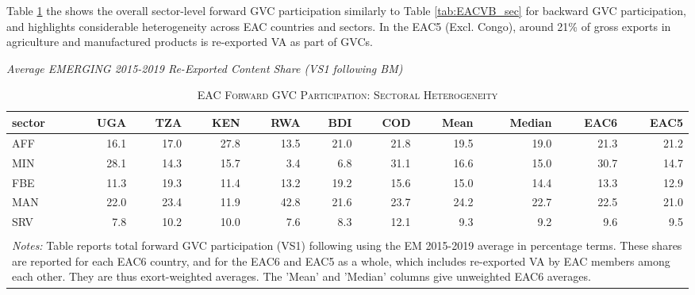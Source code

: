 \documentclass[a4paper]{article}
\begin{document}
Table \ref{tab:EACVS1_sec} the shows the overall sector-level forward GVC participation similarly to Table \ref{tab:EACVB_sec} for backward GVC participation, and highlights considerable heterogeneity across EAC countries and sectors. In the EAC5 (Excl. Congo), around 21\% of gross exports in agriculture and manufactured products is re-exported VA as part of GVCs. 

\begin{table}[h]  \vspace{-1mm}
\centering
\caption{\label{tab:EACVS1_sec}\textsc{EAC Forward GVC Participation: Sectoral Heterogeneity}}
\small{\textit{Average EMERGING 2015-2019 Re-Exported Content Share (VS1 following BM)}} \\
\vspace{1mm}
\begin{tabular}{lrrrrrrrrrr}
  \toprule
sector & UGA & TZA & KEN & RWA & BDI & COD & Mean & Median & EAC6 & EAC5 \\ 
  \midrule
AFF & 16.1 & 17.0 & 27.8 & 13.5 & 21.0 & 21.8 & 19.5 & 19.0 & 21.3 & 21.2\\ 
  MIN & 28.1 & 14.3 & 15.7 & 3.4 & 6.8 & 31.1 & 16.6 & 15.0 & 30.7 & 14.7\\ 
  FBE & 11.3 & 19.3 & 11.4 & 13.2 & 19.2 & 15.6 & 15.0 & 14.4 & 13.3 & 12.9\\ 
  MAN & 22.0 & 23.4 & 11.9 & 42.8 & 21.6 & 23.7 & 24.2 & 22.7 & 22.5 & 21.0\\ 
  SRV & 7.8 & 10.2 & 10.0 & 7.6 & 8.3 & 12.1 & 9.3 & 9.2 & 9.6 & 9.5\\
   \bottomrule \\ [-0.9em]
\multicolumn{11}{l}{\parbox{0.85\textwidth}{\scriptsize
\textit{Notes:} Table reports total forward GVC participation (VS1) following  \citet{borin2019measuring} using the EM 2015-2019 average in percentage terms. These shares are reported for each EAC6 country, and for the EAC6 and EAC5 as a whole, which includes re-exported VA by EAC members among each other. They are thus exort-weighted averages. The 'Mean' and 'Median' columns give unweighted EAC6 averages.}}
\end{tabular}
\vspace{-2mm}
\end{table}
\FloatBarrier
\end{document}

